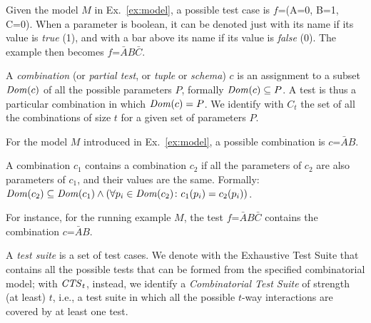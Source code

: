 \begin{tikzborder}{\cite{Gargantini16:validation}}
\begin{tikzborder}{\cite{gargantini_combinatorial_2017}}
\begin{tikzborder}{\cite{gargantini_combinatorial_2017}}
\begin{tikzborder}{\cite{garn2019}}
\begin{tikzborder}{\cite{arcaini2019achieving}}
\begin{tikzborder}{}
\begin{example}
	Given the model $M$ in Ex.~\ref{ex:model}, a possible test case is $f$=(A=0, B=1, C=0). When a parameter is boolean, it can be denoted just with its name if its value is \textit{true} (1), and with a bar above its name if its value is \textit{false} (0). The example then becomes $f$=$\bar{A}B\bar{C}$.
\end{example}

\begin{defn}\label{def:combination}
	A \textit{combination} (or \textit{partial test}, or \textit{tuple} or \textit{schema}) $c$ is an assignment to a subset $\mathit{Dom}(c)$ of all the possible parameters $P$, formally $\mathit{Dom}(c) \subseteq P$. A test is thus a particular combination in which $\mathit{Dom}(c)=P$. We identify with $C_t$ the set of all the combinations of size $t$ for a given set of parameters $P$.
\end{defn}

\begin{example}
	For the model $M$ introduced in Ex.~\ref{ex:model}, a possible combination is $c$=$\bar{A}B$.
\end{example}

\begin{defn}\label{def:combContainment}
	A combination $c_1$ contains a combination $c_2$ if all the parameters of $c_2$ are also parameters of $c_1$, and their values are the same. Formally: $\mathit{Dom}(c_2) \subseteq \mathit{Dom}(c_1) \wedge (\forall p_i \in \mathit{Dom}(c_2) \colon c_1(p_i) = c_2(p_i))$.
\end{defn}

\begin{example}
	For instance, for the running example $M$, the test $f$=$\bar{A}B\bar{C}$ contains the combination $c$=$\bar{A}B$.
\end{example}

\begin{defn}
	A {\it test suite} \ts is a set of test cases. We denote with \ets the Exhaustive Test Suite that contains all the possible tests that can be formed from the specified combinatorial model; with $\mathit{CTS}_t$, instead, we identify a {\it Combinatorial Test Suite} of strength (at least) $t$, i.e., a test suite in which all the possible $t$-way interactions are covered by at least one test.
\end{defn}


\end{tikzborder}
\end{tikzborder}
\end{tikzborder}
\end{tikzborder}
\end{tikzborder}
\end{tikzborder}
